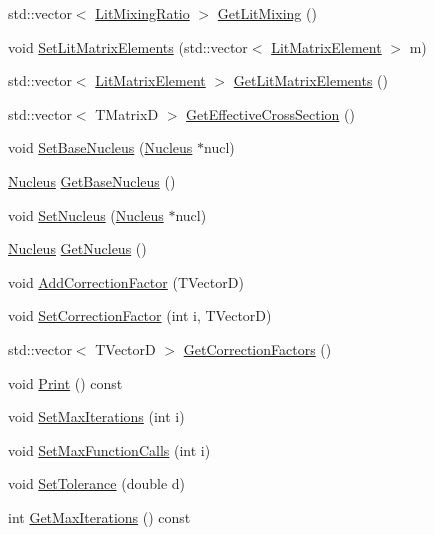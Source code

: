 \begin{DoxyCompactItemize}
std\-::vector$<$ \hyperlink{classLitMixingRatio}{Lit\-Mixing\-Ratio} $>$ \hyperlink{classCoulExFitter_a7858f449e50acd52a3600e774ea06f89}{Get\-Lit\-Mixing} ()
\item 
void \hyperlink{classCoulExFitter_add6b966bceb96c1e45501147bf51e1d8}{Set\-Lit\-Matrix\-Elements} (std\-::vector$<$ \hyperlink{classLitMatrixElement}{Lit\-Matrix\-Element} $>$ m)
\item 
std\-::vector$<$ \hyperlink{classLitMatrixElement}{Lit\-Matrix\-Element} $>$ \hyperlink{classCoulExFitter_acc3fd4d7bf2a0a85a6524869077704b4}{Get\-Lit\-Matrix\-Elements} ()
\item 
std\-::vector$<$ T\-Matrix\-D $>$ \hyperlink{classCoulExFitter_ac7290cf5ca6893275050ef26161b2832}{Get\-Effective\-Cross\-Section} ()
\item 
void \hyperlink{classCoulExFitter_a1c7724db2db1fd9c41e7daf28cbf5271}{Set\-Base\-Nucleus} (\hyperlink{classNucleus}{Nucleus} $\ast$nucl)
\item 
\hyperlink{classNucleus}{Nucleus} \hyperlink{classCoulExFitter_a70183f69951d7277f9b183f820210971}{Get\-Base\-Nucleus} ()
\item 
void \hyperlink{classCoulExFitter_a099e738fd3b6b62355db787c8268cd15}{Set\-Nucleus} (\hyperlink{classNucleus}{Nucleus} $\ast$nucl)
\item 
\hyperlink{classNucleus}{Nucleus} \hyperlink{classCoulExFitter_a0c587c7748683456fd558bad426c1fe1}{Get\-Nucleus} ()
\item 
void \hyperlink{classCoulExFitter_acd5ed89489dfbb4ec2a480d5ae933b04}{Add\-Correction\-Factor} (T\-Vector\-D)
\item 
void \hyperlink{classCoulExFitter_aec7d01311ac98f4e6a909cc76ee79a1a}{Set\-Correction\-Factor} (int i, T\-Vector\-D)
\item 
std\-::vector$<$ T\-Vector\-D $>$ \hyperlink{classCoulExFitter_ac99895ede79f2918b619f1def61ee768}{Get\-Correction\-Factors} ()
\item 
void \hyperlink{classCoulExFitter_a92e5a9e3b4fbbf8d3df93543d2bf00c5}{Print} () const 
\item 
void \hyperlink{classCoulExFitter_af64c86ac6a7c93c8bc5cbe45f072afb3}{Set\-Max\-Iterations} (int i)
\item 
void \hyperlink{classCoulExFitter_aa4176694fecb8647bf90443c0be564d4}{Set\-Max\-Function\-Calls} (int i)
\item 
void \hyperlink{classCoulExFitter_a9abeddb0f114d7dcc70309f03f54dd01}{Set\-Tolerance} (double d)
\item 
int \hyperlink{classCoulExFitter_abc2b196c4245b5c6f019a8a1f45eb00e}{Get\-Max\-Iterations} () const 

\end{DoxyCompactItemize}
